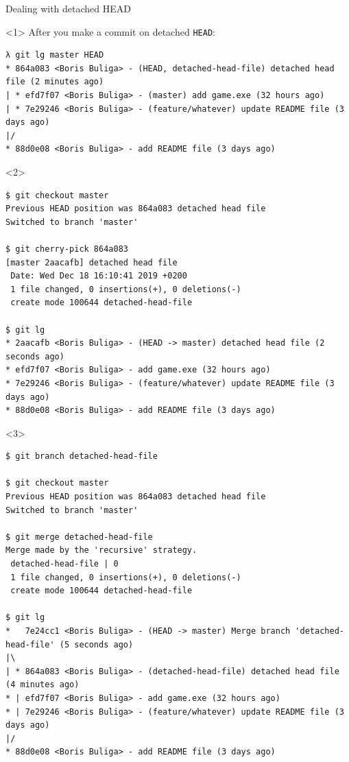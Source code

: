 \documentclass[presentation,aspectratio=169,smaller]{beamer}
\begin{document}
\begin{frame}[label={sec:orge811c3b},fragile]{Dealing with detached HEAD}
 \begin{onlyenv}<1>
After you make a commit on detached \texttt{HEAD}:

\begin{verbatim}
λ git lg master HEAD
* 864a083 <Boris Buliga> - (HEAD, detached-head-file) detached head file (2 minutes ago)
| * efd7f07 <Boris Buliga> - (master) add game.exe (32 hours ago)
| * 7e29246 <Boris Buliga> - (feature/whatever) update README file (3 days ago)
|/
* 88d0e08 <Boris Buliga> - add README file (3 days ago)
\end{verbatim}
\end{onlyenv}

\begin{onlyenv}<2>
\begin{verbatim}
$ git checkout master
Previous HEAD position was 864a083 detached head file
Switched to branch 'master'

$ git cherry-pick 864a083
[master 2aacafb] detached head file
 Date: Wed Dec 18 16:10:41 2019 +0200
 1 file changed, 0 insertions(+), 0 deletions(-)
 create mode 100644 detached-head-file

$ git lg
* 2aacafb <Boris Buliga> - (HEAD -> master) detached head file (2 seconds ago)
* efd7f07 <Boris Buliga> - add game.exe (32 hours ago)
* 7e29246 <Boris Buliga> - (feature/whatever) update README file (3 days ago)
* 88d0e08 <Boris Buliga> - add README file (3 days ago)
\end{verbatim}
\end{onlyenv}

\begin{onlyenv}<3>
\begin{verbatim}
$ git branch detached-head-file

$ git checkout master
Previous HEAD position was 864a083 detached head file
Switched to branch 'master'

$ git merge detached-head-file
Merge made by the 'recursive' strategy.
 detached-head-file | 0
 1 file changed, 0 insertions(+), 0 deletions(-)
 create mode 100644 detached-head-file

$ git lg
*   7e24cc1 <Boris Buliga> - (HEAD -> master) Merge branch 'detached-head-file' (5 seconds ago)
|\
| * 864a083 <Boris Buliga> - (detached-head-file) detached head file (4 minutes ago)
* | efd7f07 <Boris Buliga> - add game.exe (32 hours ago)
* | 7e29246 <Boris Buliga> - (feature/whatever) update README file (3 days ago)
|/
* 88d0e08 <Boris Buliga> - add README file (3 days ago)
\end{verbatim}
\end{onlyenv}
\end{frame}
\end{document}
